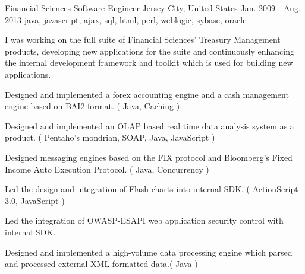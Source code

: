 \cventry
    {Financial Sciences} %
    {Software Engineer} %
    {Jersey City, United States} %
    {Jan. 2009 - Aug. 2013} %
    {java, javascript, ajax, sql, html, perl, weblogic, sybase, oracle} %
    {
        I was working on the full suite of Financial Sciences' Treasury Management products, developing new applications for the suite and continuously enhancing the
        internal development framework and toolkit which is used for building new applications.
    \begin{cvitems} %
        \item { Designed and implemented a forex accounting engine and a cash management engine based on BAI2 format. ( Java, Caching )}
        \item { Designed and implemented an OLAP based real time data analysis system as a product. ( Pentaho's mondrian, SOAP, Java, JavaScript )}
        \item { Designed messaging engines based on the FIX protocol and Bloomberg's Fixed Income Auto Execution Protocol. ( Java, Concurrency )}
        \item { Led the design and integration of Flash charts into internal SDK. ( ActionScript 3.0, JavaScript )}
        \item { Led the integration of OWASP-ESAPI web application security control with internal SDK.}
        \item { Designed and implemented a high-volume data processing engine which parsed and processed external XML formatted data.( Java )}
    \end{cvitems}
    }